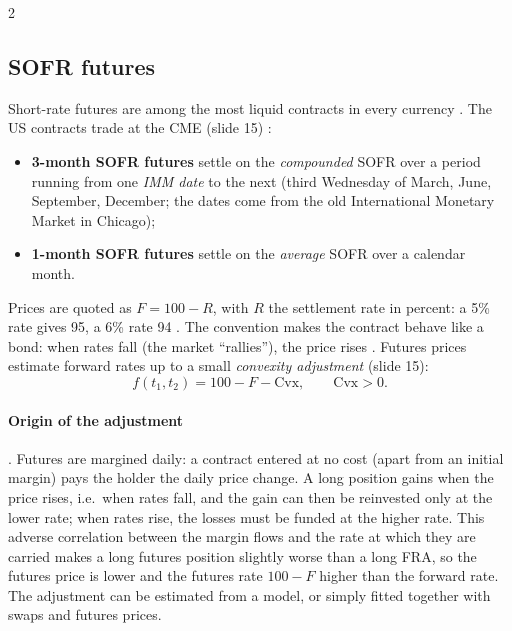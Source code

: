 \begin{paracol}{2}
\subsection{SOFR futures}\label{ch06:sec-futures}
Short-rate futures are among the most liquid contracts in every currency . The US contracts
trade at the CME (slide 15) :
\begin{itemize}
  \item \textbf{3-month SOFR futures} settle on the \emph{compounded} SOFR over a period running from one
        \emph{IMM date} to the next (third Wednesday of March, June, September, December; the dates come from
        the old International Monetary Market in Chicago);
  \item \textbf{1-month SOFR futures} settle on the \emph{average} SOFR over a calendar month.
\end{itemize}
Prices are quoted as $F=100-R$, with $R$ the settlement rate in percent: a 5\% rate gives 95, a 6\% rate 94
. The convention makes the contract behave like a bond: when rates fall (the market ``rallies''),
the price rises . Futures prices estimate forward rates up to a small \emph{convexity adjustment}
(slide 15):
\begin{equation}\label{ch06:eq-futures}
  f(t_1,t_2) = 100 - F - \mathrm{Cvx},\qquad \mathrm{Cvx}>0 .
\end{equation}

\paragraph{Origin of the adjustment} . Futures are margined daily: a contract entered at no
cost (apart from an initial margin) pays the holder the daily price change. A long position gains when the price
rises, i.e.\ when rates fall, and the gain can then be reinvested only at the lower rate; when rates rise, the
losses must be funded at the higher rate. This adverse correlation between the margin flows and the rate at
which they are carried makes a long futures position slightly worse than a long FRA, so the futures price is
lower and the futures rate $100-F$ higher than the forward rate. The adjustment can be estimated from a model, or
simply fitted together with swaps and futures prices.


\end{paracol}
